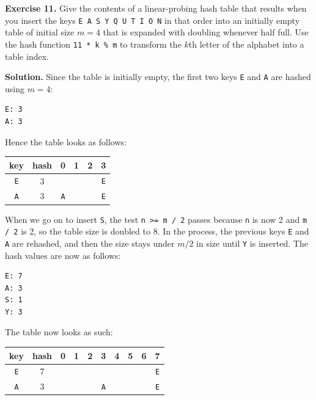 \documentclass[12pt, a4paper]{article}
\newenvironment{ex}[2][Exercise]
{\par\medskip\noindent \textbf{#1 #2.}}
{\medskip}
\newenvironment{sol}[1][Solution]
{\par\medskip\noindent \textbf{#1.} }
{\medskip}
\begin{document}
	\begin{ex}{11}
		Give the contents of a linear-probing hash table that results when you insert the keys
		\texttt{E A S Y Q U T I O N} in that order into an initially empty table of initial size $m=4$
		that is expanded with doubling whenever half full. Use the hash function \texttt{11 * k \% m}
		to transform the $k$th letter of the alphabet into a table index.
	\end{ex}
	\begin{sol}
		Since the table is initially empty, the first two keys \texttt{E} and \texttt{A}
		are hashed using $m=4$:
		\begin{lstlisting}[language={}]
E: 3
A: 3
		\end{lstlisting}
		Hence the table looks as follows:
		\begin{center}
			\begin{tabular}{cc|cccc}
				{\color{red} key} & {\color{red} hash} &
				0 & 1 & 2 & 3 \\
				\hline
				
				\texttt{E} & 3 &
				{} & {} & {} & {\color{red} \texttt{E}}  \\
				
				\texttt{A} & 3 &
				{\color{red}\texttt{A}} & {} & {} & {\color{black} \texttt{E}}  \\
			\end{tabular}
		\end{center}
		When we go on to insert \texttt{S}, the test \texttt{n >= m / 2} passes because
		\texttt{n} is now 2 and \texttt{m / 2} is 2, so the table size is doubled to 8.
		In the process, the previous keys \texttt{E} and \texttt{A} are rehashed,
		and then the size stays under $m/2$ in size until \texttt{Y} is inserted.
		The hash values are now as follows:
		\begin{lstlisting}[language={}]
E: 7
A: 3
S: 1
Y: 3
		\end{lstlisting}
			The table now looks as such:
		\begin{center}
			\begin{tabular}{cc|cccccccc}
				{\color{red} key} & {\color{red} hash} &
				0 & 1 & 2 & 3 & 4 & 5 & 6 & 7 \\
				\hline
				
				\texttt{E} & 7 &
				{} & {} & {} & {} & {} & {} & {} & {\color{red} \texttt{E}} \\
				
				\texttt{A} & 3 &
				{} & {} & {} & {\color{red}\texttt{A}} & {} & {} & {} & {\color{gray} \texttt{E}} \\
				

\end{tabular}
\end{center}
\end{sol}
\end{document}
